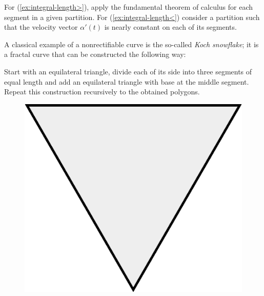  For (\ref{ex:integral-length>}), apply the fundamental theorem of calculus for each segment in a given partition. For (\ref{ex:integral-length<}) consider a partition such that the velocity vector $\alpha'(t)$ is nearly constant on each of its segments.


A classical example of a nonrectifiable curve is the so-called \emph{Koch snowflake};
it is a fractal curve that can be constructed the following way:

Start with an equilateral triangle, divide each of its side into three segments of equal length and add an equilateral triangle with base at the middle segment.
Repeat this construction recursively to the obtained polygons.
\begin{figure}[h!]
\begin{minipage}{.24\textwidth}
\centering
\vskip5.9mm
\includegraphics[scale=.15]{pics/Koch_Snowflake-0}
\end{minipage}
\hfill
\begin{minipage}{.24\textwidth}
\centering

\end{minipage}
\end{figure}
